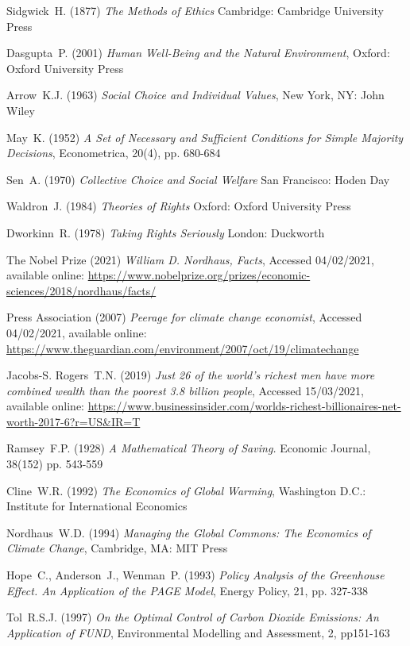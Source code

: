 \documentclass[11pt, oneside]{article}   	%
\begin{document}
\begin{thebibliography}{99}
 Sidgwick~H. (1877)
\emph{The Methods of Ethics}
Cambridge: Cambridge University Press
	
 Dasgupta~P. (2001)
\emph{Human Well-Being and the Natural Environment},
Oxford: Oxford University Press
	
 Arrow~K.J. (1963)
\emph{Social Choice and Individual Values},
New York, NY: John Wiley
	
 May~K. (1952)
\emph{A Set of Necessary and Sufficient Conditions for Simple Majority Decisions},
Econometrica, 20(4), pp. 680-684
	
 Sen~A. (1970)
\emph{Collective Choice and Social Welfare}
San Francisco: Hoden Day
	
 Waldron~J. (1984)
\emph{Theories of Rights}
Oxford: Oxford University Press
	
 Dworkinn~R. (1978)
\emph{Taking Rights Seriously}
London: Duckworth
	
 The Nobel Prize (2021)
\emph{William D. Nordhaus, Facts},
Accessed 04/02/2021, available online: 
\url{https://www.nobelprize.org/prizes/economic-sciences/2018/nordhaus/facts/}
	
 Press Association (2007)
\emph{Peerage for climate change economist},
Accessed 04/02/2021, available online: 
\url{https://www.theguardian.com/environment/2007/oct/19/climatechange}
	
 Jacobs-S. Rogers~T.N. (2019)
\emph{Just 26 of the world's richest men have more combined wealth than the poorest 3.8 billion people},
Accessed 15/03/2021, available online: 
\url{https://www.businessinsider.com/worlds-richest-billionaires-net-worth-2017-6?r=US&IR=T}
	
 Ramsey~F.P. (1928)
\emph{A Mathematical Theory of Saving.}
Economic Journal, 38(152) pp. 543-559
	
 Cline~W.R. (1992)
\emph{The Economics of Global Warming},
Washington D.C.: Institute for International Economics
	
 Nordhaus~W.D. (1994)
\emph{Managing the Global Commons: The Economics of Climate Change},
Cambridge, MA: MIT Press
	
 Hope~C., Anderson~J., Wenman~P. (1993)
\emph{Policy Analysis of the Greenhouse Effect. An Application of the PAGE Model},
Energy Policy, 21, pp. 327-338
	
 Tol~R.S.J. (1997)
\emph{On the Optimal Control of Carbon Dioxide Emissions: An Application of FUND},
Environmental Modelling and Assessment, 2, pp151-163
	

\end{thebibliography}
\end{document}
